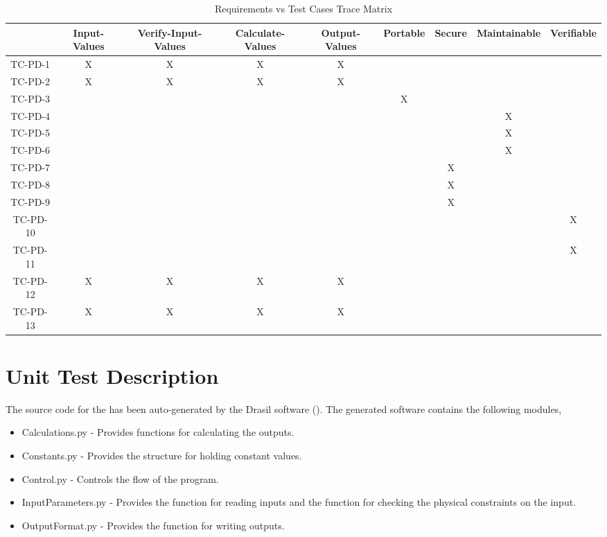 \documentclass[12pt, titlepage]{article}
\begin{document}
\begin{table}[]
\begin{adjustbox}{width=1.29\textwidth}
\begin{tabular}{c|c|c|c|c|c|c|c|c|}
 & Input-Values & Verify-Input-Values & Calculate-Values & Output-Values & Portable & Secure & Maintainable & Verifiable \\ \hline
TC-PD-1 & X & X & X  & X  &  &  &  &  \\
TC-PD-2 & X  & X  & X & X &  &  &  &  \\
TC-PD-3  &  &  &  &   & X  &  &  &  \\
TC-PD-4  &  &  &  &  &  &  &X  &  \\
TC-PD-5  &  &  &  &  &  &  &X  &  \\
TC-PD-6  &  &  &  &  &  &  &X  &  \\
TC-PD-7  &  &  &  &  &  &X  &  &  \\
TC-PD-8  &  &  &  &  &  &X  &  &  \\
TC-PD-9  &  &  &  &  &  &X  &  &  \\
TC-PD-10 &  &  &  &  &  &  &  &X  \\
TC-PD-11 &  &  &  &  &  &  &  &X \\
TC-PD-12 & X & X & X  & X  &  &  &  &  \\
TC-PD-13 & X  & X  & X & X &  &  &  &  \\
\end{tabular}
\end{adjustbox}
\caption{Requirements vs Test Cases Trace Matrix}
\label{tblTrace}
\end{table}

\section{Unit Test Description}  \label{sec_unit_tests}


The source code for the \progname{} has been auto-generated by the 
Drasil software (\cite{Drasil}). The generated software contains the following modules,

\begin{itemize}

\item Calculations.py  - Provides functions for calculating the outputs.

\item Constants.py  - Provides the structure for holding constant values.

\item Control.py  - Controls the flow of the program.

\item InputParameters.py - Provides the function for reading inputs and the function 
for checking the physical constraints on the input.

\item OutputFormat.py  -  Provides the function for writing outputs.

\end{itemize}
\end{document}

